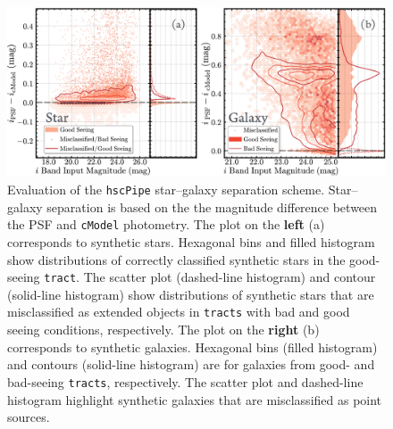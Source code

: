 \documentclass[useamsfonts]{pasj01}
\def\hscpipe{\texttt{hscPipe}}
\def\cmodel{\texttt{cModel}}
\def\tract{\texttt{tract}}
\def\tracts{\texttt{tracts}}
\begin{document}
\begin{figure}
    \begin{center}
        \includegraphics[width=\textwidth]{fig/synpipe_star_galaxy}
    \end{center}
    \caption{Evaluation of the \hscpipe{} star--galaxy separation scheme. Star--galaxy separation is based on the the magnitude difference between the PSF and \cmodel{} photometry. The plot on the \textbf{left} (a) corresponds to synthetic stars. Hexagonal bins and filled histogram show distributions of correctly classified
        synthetic stars in the good-seeing \tract{}.
 The scatter plot (dashed-line histogram) and contour (solid-line histogram)
        show distributions of synthetic stars that are misclassified as extended
        objects in \tracts{} with bad and good seeing conditions, respectively.
        The plot on the \textbf{right} (b) corresponds to synthetic 
        galaxies.
        Hexagonal bins (filled histogram) and contours (solid-line histogram)
        are for galaxies from good- and bad-seeing \tracts{}, respectively.
        The scatter plot and dashed-line histogram highlight synthetic galaxies that are
        misclassified as point sources.}
    \label{fig:sg}
\end{figure}
\end{document}
